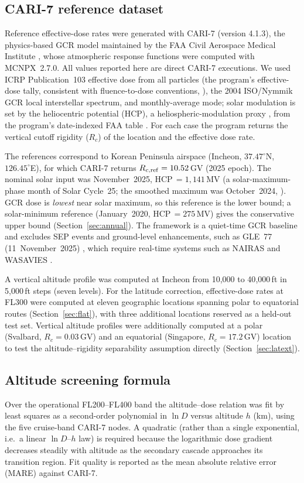\documentclass[11pt,a4paper]{article}
\begin{document}
\subsection{CARI-7 reference dataset}
\label{sec:cari7}
Reference effective-dose rates were generated with CARI-7 (version 4.1.3),
the physics-based GCR model maintained by the FAA Civil Aerospace Medical
Institute \citep{anic2016,copeland2008,faacari7}, whose atmospheric
response functions were computed with MCNPX~2.7.0. All values reported here
are direct CARI-7 executions. We used ICRP Publication~103 effective dose
from all particles (the program's effective-dose tally, consistent with
fluence-to-dose conventions, \citealp{ferrari1997}), the 2004 ISO/Nymmik
GCR local interstellar spectrum, and monthly-average mode; solar modulation
is set by the heliocentric potential (HCP), a heliospheric-modulation proxy
\citep{caballero2004,usoskin2017}, from the program's date-indexed FAA
table \citep{faahcp}. For each case the program returns the vertical cutoff
rigidity ($R_c$) of the location and the effective dose rate.

The references correspond to Korean Peninsula airspace (Incheon,
$37.47^{\circ}$N, $126.45^{\circ}$E), for which CARI-7 returns
$R_{c,\rm ref}=10.52$\,GV (2025 epoch). The nominal solar input was
November~2025, HCP\,$=1{,}141$\,MV (a solar-maximum-phase month of Solar
Cycle~25; the smoothed maximum was October~2024, \citealp{sidc2025}). GCR
dose is \emph{lowest} near solar maximum, so this reference is the lower
bound; a solar-minimum reference (January~2020, HCP\,$=275$\,MV) gives the
conservative upper bound (Section~\ref{sec:annual}). The framework is a
quiet-time GCR baseline and excludes SEP events and ground-level
enhancements, such as GLE~77 (11~November~2025) \citep{gle77}, which
require real-time systems such as NAIRAS and WASAVIES \citep{mertens2013}.

A vertical altitude profile was computed at Incheon from 10{,}000 to
40{,}000\,ft in 5{,}000\,ft steps (seven levels). For the latitude
correction, effective-dose rates at FL300 were computed at eleven
geographic locations spanning polar to equatorial routes
(Section~\ref{sec:flat}), with three additional locations reserved as a
held-out test set. Vertical altitude profiles were additionally computed
at a polar (Svalbard, $R_c=0.03$\,GV) and an equatorial (Singapore,
$R_c=17.2$\,GV) location to test the altitude--rigidity separability
assumption directly (Section~\ref{sec:latext}).

\subsection{Altitude screening formula}
\label{sec:empformula}
Over the operational FL200--FL400 band the altitude--dose relation was fit
by least squares as a second-order polynomial in $\ln D$ versus altitude
$h$ (km), using the five cruise-band CARI-7 nodes. A quadratic (rather than
a single exponential, i.e.\ a linear $\ln D$--$h$ law) is required because
the logarithmic dose gradient decreases steadily with altitude as the
secondary cascade approaches its transition region. Fit quality is reported
as the mean absolute relative error (MARE) against CARI-7.
\end{document}

